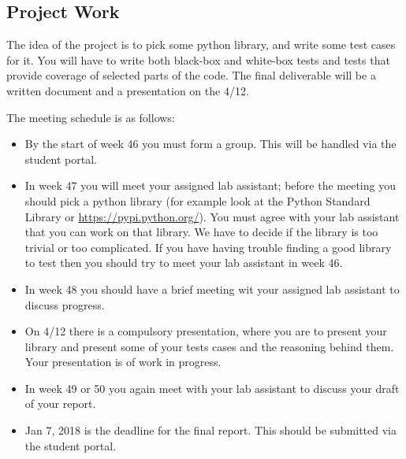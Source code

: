 \documentclass[a4page]{article}
\begin{document}
\subsection{Project Work}

The idea of the project is to pick some python library, and write some
test cases for it. You will have to write both black-box and white-box
tests and tests that provide coverage of selected parts of the
code. The final deliverable will be a written document and a
presentation on the 4/12.

The meeting schedule is as follows:
  \begin{itemize}
  \item By  the start of  week  46 you must form a group. This will be
    handled via the student portal.
  \item In week 47 you will meet your assigned lab assistant; before the
    meeting you should pick a python library (for example look at the Python
    Standard Library or \url{https://pypi.python.org/}). You must agree
    with your lab assistant that you can work on that library. We have
    to decide if the library is too trivial or too complicated. If you have
    having trouble finding a good library to test then you should try to meet
    your lab assistant in week 46.
  \item In week 48 you should have a brief meeting wit your assigned lab
    assistant to discuss progress.
        \item On 4/12 there is a compulsory presentation, where you are
      to present your library and present some of your tests cases
      and the reasoning behind them. Your presentation is of work in
      progress.
    \item In week 49 or 50 you again meet with your lab assistant to
      discuss your draft of your  report.
    \item Jan 7,  2018 is  the deadline for the final
      report. This should be submitted via the student portal.

\end{itemize}
\end{document}
